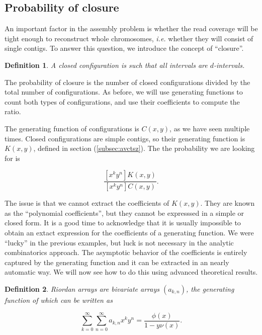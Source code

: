 \documentclass{article}
\newtheorem{definition}{Definition}
\begin{document}
\subsection{Probability of closure}

An important factor in the assembly problem is whether the read coverage
will be tight enough to reconstruct whole chromosomes, \textit{i.e.}
whether they will consist of single contigs. To answer this question, we
introduce the concept of ``closure''.

\begin{definition}
\label{def:closure}
A closed configuration is such that all intervals are $d$-intervals.
\end{definition}

The probability of closure is the number of closed configurations divided
by the total number of configurations. As before, we will use generating
functions to count both types of configurations, and use their
coefficients to compute the ratio.

The generating function of configurations is $C(x,y)$, as we have seen
multiple times. Closed configurations are simple contigs, so their
generating function is $K(x,y)$, defined in section (\ref{subsec:avctsz}).
The the probability we are looking for is

\begin{equation*}
\frac{[x^ky^n]K(x,y)}{[x^ky^n]C(x,y)}.
\end{equation*}

The issue is that we cannot extract the coefficients of $K(x,y)$. They are
known as the ``polynomial coefficients'', but they cannot be expresssed in
a simple or closed form. It is a good time to acknowledge that it is
usually impossible to obtain an extact expression for the coefficients of
a generating function. We were ``lucky'' in the previous examples, but
luck is not necessary in the analytic combinatorics approach. The
asymptotic behavior of the coefficients is entirely captured by the
generating function and it can be extracted in an nearly automatic way. We
will now see how to do this using advanced theoretical results.

\begin{definition}
Riordan arrays are bivariate arrays $(a_{k,n})$, the generating function
of which can be written as

\begin{equation}
\label{eq:RAGF}
\sum_{k=0}^\infty \sum_{n=0}^\infty a_{k,n} x^k y^n =
\frac{\phi(x)}{1-y \nu(x)}.
\end{equation}
\end{definition}
\end{document}
